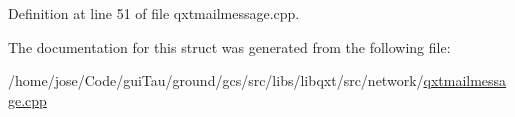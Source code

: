 Definition at line 51 of file qxtmailmessage.\-cpp.



The documentation for this struct was generated from the following file\-:\begin{DoxyCompactItemize}
\item 
/home/jose/\-Code/gui\-Tau/ground/gcs/src/libs/libqxt/src/network/\hyperlink{qxtmailmessage_8cpp}{qxtmailmessage.\-cpp}\end{DoxyCompactItemize}
